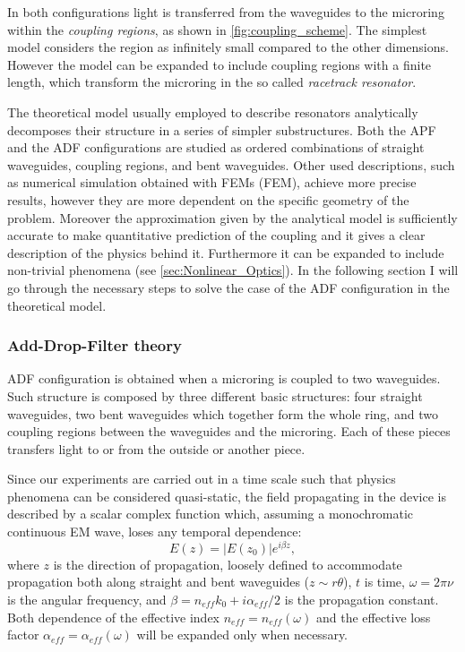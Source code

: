 In both configurations light is transferred from the waveguides to the microring within the \textit{coupling regions}, as shown in \autoref{fig:coupling_scheme}.
The simplest model considers the region as infinitely small compared to the other dimensions.
However the model can be expanded to include coupling regions with a finite length, which transform the microring in the so called \textit{racetrack resonator}.

The theoretical model usually employed to describe resonators analytically decomposes their structure in a series of simpler substructures.
Both the \acs{APF} and the \acs{ADF} configurations are studied as ordered combinations of straight waveguides, coupling regions, and bent waveguides.
Other used descriptions, such as numerical simulation obtained with \aclp{FEM} (\acs{FEM}), achieve more precise results, however they are more dependent on the specific geometry of the problem.
Moreover the approximation given by the analytical model is sufficiently accurate to make quantitative prediction of the coupling and it gives a clear description of the physics behind it.
Furthermore it can be expanded to include non-trivial phenomena (see \autoref{sec:Nonlinear_Optics}).
In the following section I will go through the necessary steps to solve the case of the \acs{ADF} configuration in the theoretical model.

\newpage
\subsubsection{Add-Drop-Filter theory}
\label{sssec:Add-Drop-Filter_theory}
\acs{ADF} configuration is obtained when a microring is coupled to two waveguides.
Such structure is composed by three different basic structures: four straight waveguides, two bent waveguides which together form the whole ring, and two coupling regions between the waveguides and the microring.
Each of these pieces transfers light to or from the outside or another piece.

Since our experiments are carried out in a time scale such that physics phenomena can be considered quasi-static, the field propagating in the device is described by a scalar complex function which, assuming a monochromatic continuous \acs{EM} wave, loses any temporal dependence:
\begin{equation}
	E(z) = |E(z_0)|e^{i\beta z},
\end{equation}
where $z$ is the direction of propagation, loosely defined to accommodate propagation both along straight and bent waveguides ($z\sim r\theta$), $t$ is time, $\omega=2\pi\nu$ is the angular frequency, and $\beta = n_{eff}k_0+i\alpha_{eff}/2$ is the propagation constant.
Both dependence of the effective index $n_{eff}=n_{eff}\left(\omega\right)$ and the effective loss factor $\alpha_{eff}=\alpha_{eff}\left(\omega\right)$ will be expanded only when necessary.

